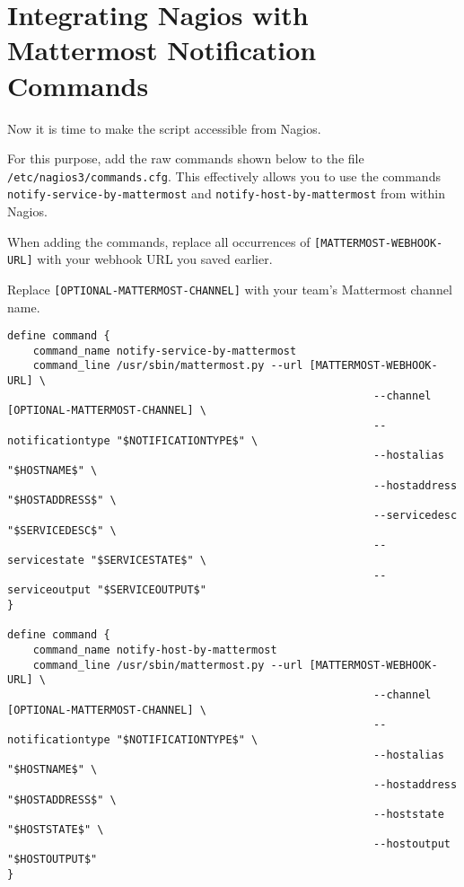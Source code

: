 \documentclass{article}   	%
\begin{document}

\section{Integrating Nagios with Mattermost Notification Commands}

Now it is time to make the script accessible from Nagios. 

For this purpose, add the raw commands shown below to the file {\tt /etc/nagios3/commands.cfg}. This effectively allows you to use the commands {\tt notify-service-by-mattermost} and {\tt notify-host-by-mattermost} from within Nagios.

When adding the commands, replace all occurrences of {\tt [MATTERMOST-WEBHOOK-URL]} with your webhook URL you saved earlier.

Replace {\tt [OPTIONAL-MATTERMOST-CHANNEL]} with your team's Mattermost channel name.

\begin{verbatim}
define command {
    command_name notify-service-by-mattermost
    command_line /usr/sbin/mattermost.py --url [MATTERMOST-WEBHOOK-URL] \
                                                         --channel [OPTIONAL-MATTERMOST-CHANNEL] \
                                                         --notificationtype "$NOTIFICATIONTYPE$" \
                                                         --hostalias "$HOSTNAME$" \
                                                         --hostaddress "$HOSTADDRESS$" \
                                                         --servicedesc "$SERVICEDESC$" \
                                                         --servicestate "$SERVICESTATE$" \
                                                         --serviceoutput "$SERVICEOUTPUT$"
}

define command {
    command_name notify-host-by-mattermost
    command_line /usr/sbin/mattermost.py --url [MATTERMOST-WEBHOOK-URL] \
                                                         --channel [OPTIONAL-MATTERMOST-CHANNEL] \
                                                         --notificationtype "$NOTIFICATIONTYPE$" \
                                                         --hostalias "$HOSTNAME$" \
                                                         --hostaddress "$HOSTADDRESS$" \
                                                         --hoststate "$HOSTSTATE$" \
                                                         --hostoutput "$HOSTOUTPUT$"
}
\end{verbatim}
\end{document}
